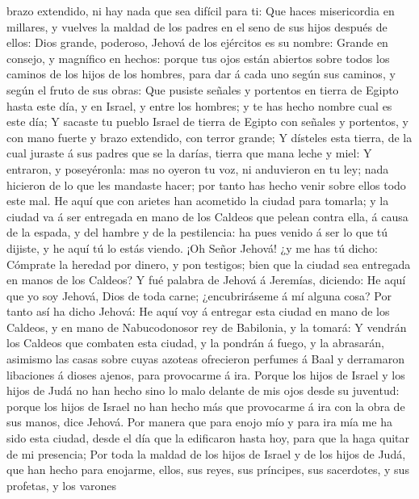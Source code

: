 brazo extendido, ni hay nada que sea difícil para ti: 
Que haces misericordia en millares, y vuelves la maldad de los padres en
el seno de sus hijos después de ellos: Dios grande, poderoso, Jehová de
los ejércitos es su nombre:  Grande en consejo, y
magnífico en hechos: porque tus ojos están abiertos sobre todos los
caminos de los hijos de los hombres, para dar á cada uno según sus
caminos, y según el fruto de sus obras:  Que pusiste
señales y portentos en tierra de Egipto hasta este día, y en Israel, y
entre los hombres; y te has hecho nombre cual es este día;
 Y sacaste tu pueblo Israel de tierra de Egipto con
señales y portentos, y con mano fuerte y brazo extendido, con terror
grande;  Y dísteles esta tierra, de la cual juraste á sus
padres que se la darías, tierra que mana leche y miel:  Y
entraron, y poseyéronla: mas no oyeron tu voz, ni anduvieron en tu ley;
nada hicieron de lo que les mandaste hacer; por tanto has hecho venir
sobre ellos todo este mal.  He aquí que con arietes han
acometido la ciudad para tomarla; y la ciudad va á ser entregada en mano
de los Caldeos que pelean contra ella, á causa de la espada, y del
hambre y de la pestilencia: ha pues venido á ser lo que tú dijiste, y he
aquí tú lo estás viendo.  ¡Oh Señor Jehová! ¿y me has tú
dicho: Cómprate la heredad por dinero, y pon testigos; bien que la
ciudad sea entregada en manos de los Caldeos?  Y fué
palabra de Jehová á Jeremías, diciendo:  He aquí que yo
soy Jehová, Dios de toda carne; ¿encubriráseme á mí alguna cosa?
 Por tanto así ha dicho Jehová: He aquí voy á entregar
esta ciudad en mano de los Caldeos, y en mano de Nabucodonosor rey de
Babilonia, y la tomará:  Y vendrán los Caldeos que
combaten esta ciudad, y la pondrán á fuego, y la abrasarán, asimismo las
casas sobre cuyas azoteas ofrecieron perfumes á Baal y derramaron
libaciones á dioses ajenos, para provocarme á ira. 
Porque los hijos de Israel y los hijos de Judá no han hecho sino lo malo
delante de mis ojos desde su juventud: porque los hijos de Israel no han
hecho más que provocarme á ira con la obra de sus manos, dice Jehová.
 Por manera que para enojo mío y para ira mía me ha sido
esta ciudad, desde el día que la edificaron hasta hoy, para que la haga
quitar de mi presencia;  Por toda la maldad de los hijos
de Israel y de los hijos de Judá, que han hecho para enojarme, ellos,
sus reyes, sus príncipes, sus sacerdotes, y sus profetas, y los varones
